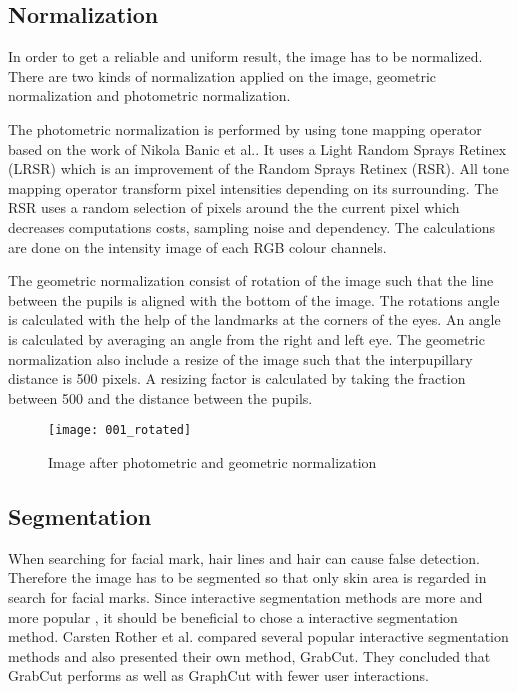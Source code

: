 \subsection{Normalization}

In order to get a reliable and uniform result, the image has to be normalized. There are two kinds of normalization applied on the image, geometric normalization and photometric normalization.  

The photometric normalization is performed by using tone mapping operator based on the work of Nikola Banic et al.\cite{badger}. It uses a Light Random Sprays Retinex (LRSR) which is an improvement of the Random Sprays Retinex (RSR)\cite{RSR}. All tone mapping operator transform pixel intensities depending on its surrounding. The RSR uses a random selection of pixels around the the current pixel which decreases computations costs, sampling noise and dependency. The calculations are done on the intensity image of each RGB colour channels.

The geometric normalization consist of rotation of the image such that the line between the pupils is aligned with the bottom of the image. The rotations angle is calculated with the help of the landmarks at the corners of the eyes. An angle is calculated by averaging an angle from the right and left eye. The geometric normalization also include a resize of the image such that the interpupillary distance is 500 pixels. A resizing factor is calculated by taking the fraction between 500 and the distance between the pupils.         

\begin{figure}[h!]
	\centering
	\texttt{[image: 001\_rotated]}
	\caption{Image after photometric and geometric normalization \label{fig:rotated_img}}
\end{figure}
         
\subsection{Segmentation}
When searching for facial mark, hair lines and hair can cause false detection. Therefore the image has to be segmented so that only skin area is regarded in search for facial marks. Since interactive segmentation methods are more and more popular \cite{graphcut}, it should be beneficial to chose a interactive segmentation method. Carsten Rother et al.\cite{grabcut} compared several popular interactive segmentation methods and also presented their own method, GrabCut. They concluded that GrabCut performs as well as GraphCut \cite{graphcut} with fewer user interactions.

